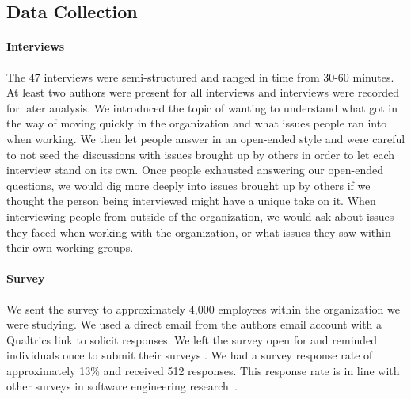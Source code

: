 \documentclass[sigconf, nonacm]{acmart}
\begin{document}
\subsection{Data Collection}
\paragraph{Interviews}
The 47 interviews were semi-structured and ranged in time from 30-60 minutes. At least two authors were present for all interviews and interviews were recorded for later analysis. We introduced the topic of wanting to understand what got in the way of moving quickly in the organization and what issues people ran into when working. We then let people answer in an open-ended style and were careful to not seed the discussions with issues brought up by others in order to let each interview stand on its own. Once people exhausted answering our open-ended questions, we would dig more deeply into issues brought up by others if we thought the person being interviewed might have a unique take on it. When interviewing people from outside of the organization, we would ask about issues they faced when working with the organization, or what issues they saw within their own working groups. 

\paragraph{Survey}
We sent the survey to approximately 4,000 employees within the organization we were studying. We used a direct email from the authors email account with a Qualtrics link to solicit responses. We left the survey open for  and reminded individuals once to submit their surveys . We had a survey response rate of approximately 13\% and received 512 responses. 
This response rate is in line with other surveys in software engineering research~\cite{punter2003conducting}.

\end{document}
